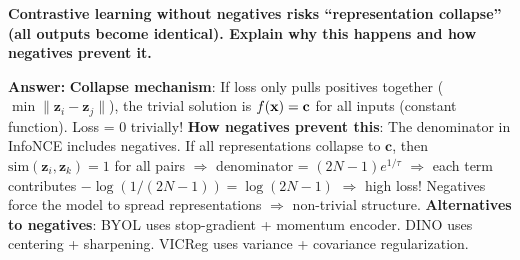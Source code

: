 \begin{examq}
\textbf{Contrastive learning without negatives risks ``representation collapse'' (all outputs become identical). Explain why this happens and how negatives prevent it.}

\textbf{Answer:} \textbf{Collapse mechanism}: If loss only pulls positives together ($\min \|\mathbf{z}_i - \mathbf{z}_j\|$), the trivial solution is $f(\mathbf{x}) = \mathbf{c}$ for all inputs (constant function). Loss = 0 trivially! \textbf{How negatives prevent this}: The denominator in InfoNCE includes negatives. If all representations collapse to $\mathbf{c}$, then $\text{sim}(\mathbf{z}_i, \mathbf{z}_k) = 1$ for all pairs $\Rightarrow$ denominator = $(2N{-}1)e^{1/\tau}$ $\Rightarrow$ each term contributes $-\log(1/(2N{-}1)) = \log(2N{-}1)$ $\Rightarrow$ high loss! Negatives force the model to spread representations $\Rightarrow$ non-trivial structure. \textbf{Alternatives to negatives}: BYOL uses stop-gradient + momentum encoder. DINO uses centering + sharpening. VICReg uses variance + covariance regularization.
\end{examq}
